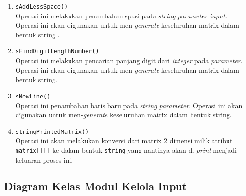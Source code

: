\begin{enumerate}
\begin{enumerate}
\begin{itemize}
\begin{enumerate}
				\item \texttt{sAddLessSpace()}\\
				Operasi ini melakukan penambahan spasi pada \textit{string parameter input}. Operasi ini akan digunakan untuk men-\textit{generate} keseluruhan matrix dalam bentuk string	.
				
				\item \texttt{sFindDigitLengthNumber()}\\
				Operasi ini melakukan pencarian panjang digit dari \textit{integer} pada \textit{parameter}. Operasi ini akan digunakan untuk men-\textit{generate} keseluruhan matrix dalam bentuk string.
				
				\item \texttt{sNewLine()}\\
				Operasi ini penambahan baris baru pada \textit{string parameter}. Operasi ini akan digunakan untuk men-\textit{generate} keseluruhan matrix dalam bentuk string.
				
				\item \texttt{stringPrintedMatrix()}\\
				Operasi ini akan melakukan konversi dari matrix 2 dimensi milik atribut \texttt{matrix[][]} ke dalam bentuk \texttt{string} yang nantinya akan di-\textit{print} menjadi keluaran proses ini.
				
			\end{enumerate}					

		\end{itemize}
		
	\end{enumerate}
	
	
\end{enumerate}

\subsection{Diagram Kelas Modul Kelola Input}

